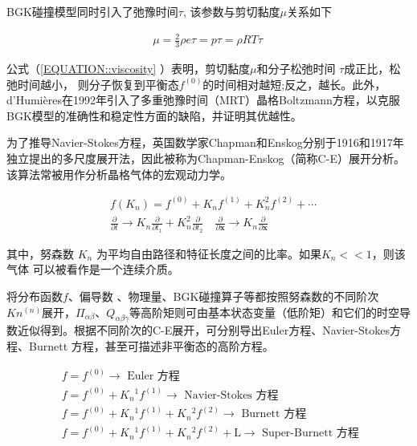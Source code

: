 \documentclass[MathematicsNumericsDerivationsAndOpenFOAM.tex]{subfiles}
\begin{document}
BGK碰撞模型同时引入了弛豫时间$\tau$, 该参数与剪切黏度$\mu$关系如下

\begin{equation}
  \begin{aligned}
    \mu=\frac{2}{3} \rho e \tau=p \tau=\rho R T \tau
  \end{aligned}
  \label{EQUATION::viscosity} ~
\end{equation}



公式（\ref{EQUATION::viscosity} ）表明，剪切黏度$\mu$和分子松弛时间 $\tau$成正比，松弛时间越小， 则分子恢复到平衡态$f^{(0)}$的时间相对越短;反之，越长。此外，d’Humières在1992年引入了多重弛豫时间（MRT）晶格Boltzmann方程，以克服BGK模型的准确性和稳定性方面的缺陷，并证明其优越性。




为了推导Navier-Stokes方程，英国数学家Chapman和Enskog分别于1916和1917年独立提出的多尺度展开法，因此被称为Chapman-Enskog（简称C-E）展开分析。该算法常被用作分析晶格气体的宏观动力学。

\begin{equation}
  \begin{aligned}
     & f\left(K_{n}\right)=f^{(0)}+K_{n} f^{(1)}+K_{n}^{2} f^{(2)}+\cdots                                                                                                                                                                \\
     & \frac{\partial}{\partial t} \rightarrow K_{n} \frac{\partial}{\partial t_{1}}+K_{n}^{2} \frac{\partial}{\partial t_{2}} \quad \frac{\partial}{\partial \boldsymbol{x}} \rightarrow K_{n} \frac{\partial}{\partial \boldsymbol{x}}
  \end{aligned}
\end{equation}

其中，努森数 $K_n$ 为平均自由路径和特征长度之间的比率。如果$K_n<<1$，则该气体 可以被看作是一个连续介质。


将分布函数$f$、偏导数 、物理量、BGK碰撞算子等都按照努森数的不同阶次$Kn^{(n)}$展开，$\Pi_{\alpha \beta}$、$Q_{\alpha \beta \gamma}$等高阶矩则可由基本状态变量（低阶矩）和它们的时空导数近似得到。根据不同阶次的C-E展开，可分别导出Euler方程、Navier-Stokes方程、Burnett 方程，甚至可描述非平衡态的高阶方程。

\begin{equation}
  \boxed{
    \begin{aligned}
       & f=f^{(0)} \longrightarrow \text { Euler 方程 }                                                              \\
       & f=f^{(0)}+K_{n}{ }^{1} f^{(1)} \longrightarrow \text { Navier-Stokes 方程 }                                 \\
       & f=f^{(0)}+K_{n}{ }^{1} f^{(1)}+K_{n}{ }^{2} f^{(2)} \longrightarrow \text { Burnett 方程 }                  \\
       & f=f^{(0)}+K_{n}{ }^{1} f^{(1)}+K_{n}{ }^{2} f^{(2)}+\mathrm{L} \longrightarrow \text { Super-Burnett 方程 }
    \end{aligned}
  }
  \label{EQUATION::CE EXPANDING} ~
\end{equation}
\end{document}
